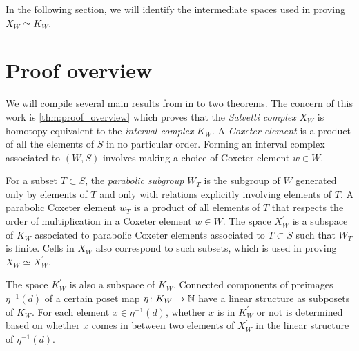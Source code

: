 \documentclass[class=guthesis, crop=false]{standalone}
\begin{document}
In the following section, we will identify the intermediate spaces used in proving $X_W \simeq K_W$.

\section{Proof overview}

We will compile several main results from \cite{paolini_salvetti_kpi1_2021} in to two theorems. The concern of this work is \cref{thm:proof_overview} which proves that the \emph{Salvetti complex} $X_W$ is homotopy equivalent to the \emph{interval complex} $K_W$. A \emph{Coxeter element} is a product of all the elements of $S$ in no particular order. Forming an interval complex associated to $(W,S)$ involves making a choice of Coxeter element $w \in W$. 

For a subset $T \subset S$, the \emph{parabolic subgroup} $W_T$ is the subgroup of $W$ generated only by elements of $T$ and only with relations explicitly involving elements of $T$. A parabolic Coxeter element $w_T$ is a product of all elements of $T$ that respects the order of multiplication in a Coxeter element $w \in W$. The space $X_W^\prime$ is a subspace of $K_W$ associated to parabolic Coxeter elements associated to $T \subset S$ such that $W_T$ is finite. Cells in $X_W$ also correspond to such subsets, which is used in proving $X_W \simeq X_W^\prime$.

The space $K_W^\prime$ is also a subspace of $K_W$. Connected components of preimages $\eta^{-1}(d)$ of a certain poset map $\eta \colon K_W \to \mathbb{N}$ have a linear structure as subposets of $K_W$. For each element $x \in \eta^{-1}(d)$, whether $x$ is in $K_W^\prime$ or not is determined based on whether $x$ comes in between two elements of $X_W^\prime$ in the linear structure of $\eta^{-1}(d)$.
\end{document}
